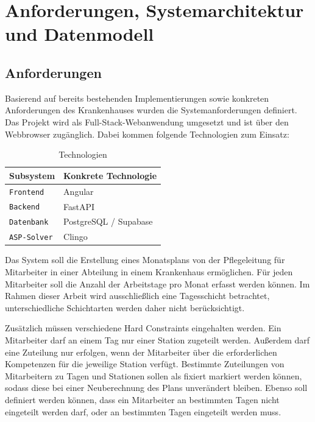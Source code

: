 \cleardoubleoddpage%
\chapter{Anforderungen, Systemarchitektur und Datenmodell}
\section{Anforderungen}
Basierend auf bereits bestehenden Implementierungen sowie konkreten Anforderungen des Krankenhauses wurden die Systemanforderungen definiert. Das Projekt wird als Full-Stack-Webanwendung umgesetzt und ist über den Webbrowser zugänglich. Dabei kommen folgende Technologien zum Einsatz:
\begin{table}[h]
	\centering
	\caption{
		Technologien
	}\label{tab:nicetable}
	\begin{tabularx}{\linewidth}{l>{\raggedright\arraybackslash}X}
		\toprule
		\textbf{Subsystem}        & \textbf{Konkrete Technologie} \\
		\midrule
		\texttt{Frontend}     & Angular \\
		\texttt{Backend}      & FastAPI \\
		\texttt{Datenbank} & PostgreSQL / Supabase \\
		\texttt{ASP-Solver}      & Clingo \\
		\bottomrule
	\end{tabularx}
\end{table}

Das System soll die Erstellung eines Monatsplans von der Pflegeleitung für Mitarbeiter in einer Abteilung in einem Krankenhaus ermöglichen. Für jeden Mitarbeiter soll die Anzahl der Arbeitstage pro Monat erfasst werden können. Im Rahmen dieser Arbeit wird ausschließlich eine Tagesschicht betrachtet, unterschiedliche Schichtarten werden daher nicht berücksichtigt.

Zusätzlich müssen verschiedene Hard Constraints eingehalten werden. Ein Mitarbeiter darf an einem Tag nur einer Station zugeteilt werden. Außerdem darf eine Zuteilung nur erfolgen, wenn der Mitarbeiter über die erforderlichen Kompetenzen für die jeweilige Station verfügt. Bestimmte Zuteilungen von Mitarbeitern zu Tagen und Stationen sollen als fixiert markiert werden können, sodass diese bei einer Neuberechnung des Plans unverändert bleiben. Ebenso soll definiert werden können, dass ein Mitarbeiter an bestimmten Tagen nicht eingeteilt werden darf, oder an bestimmten Tagen eingeteilt werden muss.

